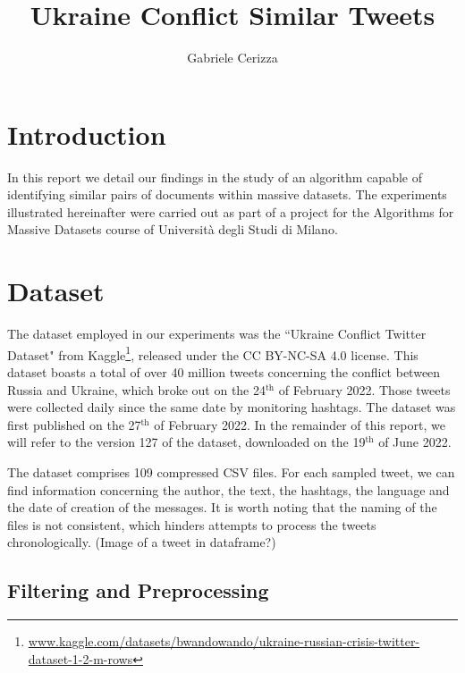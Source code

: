 \documentclass[runningheads]{llncs}
\begin{document}
\title{
    Ukraine Conflict Similar Tweets
}
\author{Gabriele Cerizza}


\maketitle

\section{Introduction}
\label{sec:introduction}

In this report we detail our findings in the study of an algorithm capable of identifying similar pairs of documents within massive datasets. The experiments illustrated hereinafter were carried out as part of a project for the Algorithms for Massive Datasets course of Università degli Studi di Milano.

\section{Dataset}
\label{sec:dataset}

The dataset employed in our experiments was the “Ukraine Conflict Twitter Dataset" from Kaggle\footnote{\url{www.kaggle.com/datasets/bwandowando/ukraine-russian-crisis-twitter-dataset-1-2-m-rows}}, released under the CC BY-NC-SA 4.0 license. This dataset boasts a total of over 40 million tweets concerning the conflict between Russia and Ukraine, which broke out on the 24$^{\text{th}}$ of February 2022. Those tweets were collected daily since the same date by monitoring hashtags. The dataset was first published on the 27$^{\text{th}}$ of February 2022. In the remainder of this report, we will refer to the version 127 of the dataset, downloaded on the 19$^{\text{th}}$ of June 2022. 

The dataset comprises 109 compressed CSV files. For each sampled tweet, we can find information concerning the author, the text, the hashtags, the language and the date of creation of the messages. It is worth noting that the naming of the files is not consistent, which hinders attempts to process the tweets chronologically. (Image of a tweet in dataframe?)

\subsection{Filtering and Preprocessing}
\end{document}

